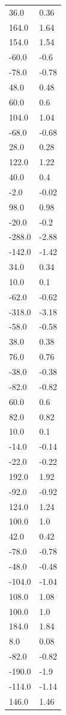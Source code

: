 \begin{longtable}{ll}
36.0 & 0.36 \\
164.0 & 1.64 \\
154.0 & 1.54 \\
-60.0 & -0.6 \\
-78.0 & -0.78 \\
48.0 & 0.48 \\
60.0 & 0.6 \\
104.0 & 1.04 \\
-68.0 & -0.68 \\
28.0 & 0.28 \\
122.0 & 1.22 \\
40.0 & 0.4 \\
-2.0 & -0.02 \\
98.0 & 0.98 \\
-20.0 & -0.2 \\
-288.0 & -2.88 \\
-142.0 & -1.42 \\
34.0 & 0.34 \\
10.0 & 0.1 \\
-62.0 & -0.62 \\
-318.0 & -3.18 \\
-58.0 & -0.58 \\
38.0 & 0.38 \\
76.0 & 0.76 \\
-38.0 & -0.38 \\
-82.0 & -0.82 \\
60.0 & 0.6 \\
82.0 & 0.82 \\
10.0 & 0.1 \\
-14.0 & -0.14 \\
-22.0 & -0.22 \\
192.0 & 1.92 \\
-92.0 & -0.92 \\
124.0 & 1.24 \\
100.0 & 1.0 \\
42.0 & 0.42 \\
-78.0 & -0.78 \\
-48.0 & -0.48 \\
-104.0 & -1.04 \\
108.0 & 1.08 \\
100.0 & 1.0 \\
184.0 & 1.84 \\
8.0 & 0.08 \\
-82.0 & -0.82 \\
-190.0 & -1.9 \\
-114.0 & -1.14 \\
146.0 & 1.46 \\

\end{longtable}
